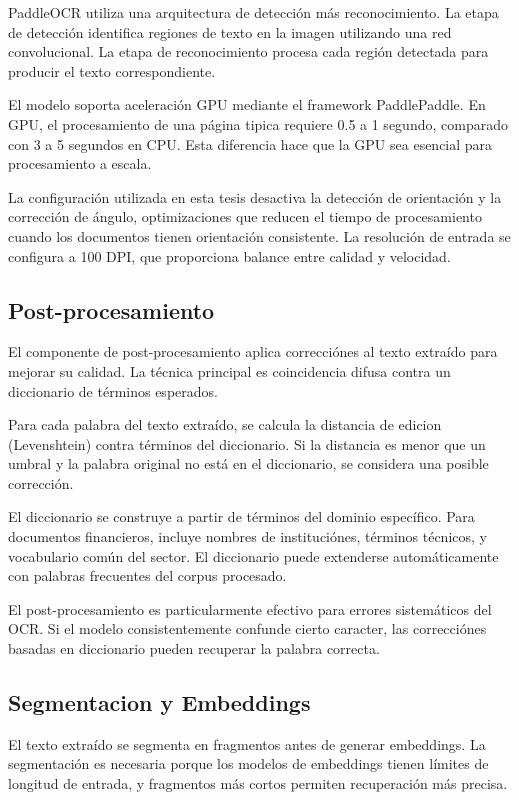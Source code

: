 \documentclass[12pt,a4paper,twoside]{book}
\begin{document}
PaddleOCR utiliza una arquitectura de detección más reconocimiento. La etapa de detección identifica regiones de texto en la imagen utilizando una red convolucional. La etapa de reconocimiento procesa cada región detectada para producir el texto correspondiente.

El modelo soporta aceleración GPU mediante el framework PaddlePaddle. En GPU, el procesamiento de una página tipica requiere 0.5 a 1 segundo, comparado con 3 a 5 segundos en CPU. Esta diferencia hace que la GPU sea esencial para procesamiento a escala.

La configuración utilizada en esta tesis desactiva la detección de orientación y la corrección de ángulo, optimizaciones que reducen el tiempo de procesamiento cuando los documentos tienen orientación consistente. La resolución de entrada se configura a 100 DPI, que proporciona balance entre calidad y velocidad.

\subsection{Post-procesamiento}

El componente de post-procesamiento aplica correcciónes al texto extraído para mejorar su calidad. La técnica principal es coincidencia difusa contra un diccionario de términos esperados.

Para cada palabra del texto extraído, se calcula la distancia de edicion (Levenshtein) contra términos del diccionario. Si la distancia es menor que un umbral y la palabra original no está en el diccionario, se considera una posible corrección.

El diccionario se construye a partir de términos del dominio específico. Para documentos financieros, incluye nombres de instituciónes, términos técnicos, y vocabulario común del sector. El diccionario puede extenderse automáticamente con palabras frecuentes del corpus procesado.

El post-procesamiento es particularmente efectivo para errores sistemáticos del OCR. Si el modelo consistentemente confunde cierto caracter, las correcciónes basadas en diccionario pueden recuperar la palabra correcta.

\subsection{Segmentacion y Embeddings}

El texto extraído se segmenta en fragmentos antes de generar embeddings. La segmentación es necesaria porque los modelos de embeddings tienen límites de longitud de entrada, y fragmentos más cortos permiten recuperación más precisa.
\end{document}
